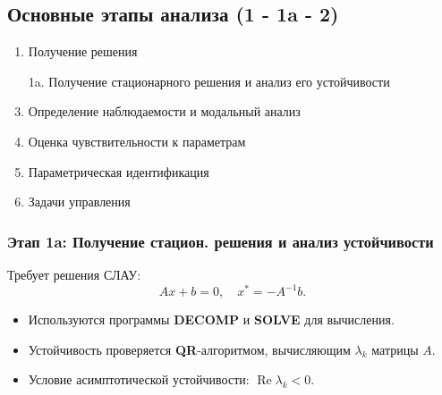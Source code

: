	\subsection{Основные этапы анализа (1 - 1a - 2)}
	\begin{enumerate}
		\item Получение решения
		\item[1a.] Получение стационарного решения и анализ его устойчивости
		\item Определение наблюдаемости и модальный анализ
		\item Оценка чувствительности к параметрам
		\item Параметрическая идентификация
		\item Задачи управления
	\end{enumerate}
	
	\subsubsection{Этап 1a: Получение стацион. решения и анализ устойчивости}
	Требует решения СЛАУ:
	\begin{equation}
		A x + b = 0, \quad x^* = -A^{-1} b.
	\end{equation}
	\begin{itemize}
		\item Используются программы \textbf{DECOMP} и \textbf{SOLVE} для вычисления.
		\item Устойчивость проверяется \textbf{QR}-алгоритмом, вычисляющим \(\lambda_k\) матрицы \(A\).
		\item Условие асимптотической устойчивости: \(\operatorname{Re} \lambda_k < 0\).
	\end{itemize}
